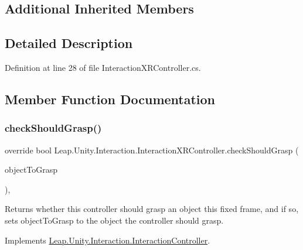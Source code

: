 \subsection*{Additional Inherited Members}


\subsection{Detailed Description}


Definition at line 28 of file Interaction\+X\+R\+Controller.\+cs.



\subsection{Member Function Documentation}
\mbox{\label{class_leap_1_1_unity_1_1_interaction_1_1_interaction_x_r_controller_aad12f5a78dea6345158e44d87e17a5f6}} 
\subsubsection{\texorpdfstring{checkShouldGrasp()}{checkShouldGrasp()}}
{\footnotesize\ttfamily override bool Leap.\+Unity.\+Interaction.\+Interaction\+X\+R\+Controller.\+check\+Should\+Grasp (\begin{DoxyParamCaption}\item[{out \mbox{\hyperlink{interface_leap_1_1_unity_1_1_interaction_1_1_i_interaction_behaviour}{I\+Interaction\+Behaviour}}}]{object\+To\+Grasp }\end{DoxyParamCaption})\hspace{0.3cm}{\ttfamily [protected]}, {\ttfamily [virtual]}}



Returns whether this controller should grasp an object this fixed frame, and if so, sets object\+To\+Grasp to the object the controller should grasp. 



Implements \mbox{\hyperlink{class_leap_1_1_unity_1_1_interaction_1_1_interaction_controller_a672d3a9313dbe37a693702024a61657d}{Leap.\+Unity.\+Interaction.\+Interaction\+Controller}}.



